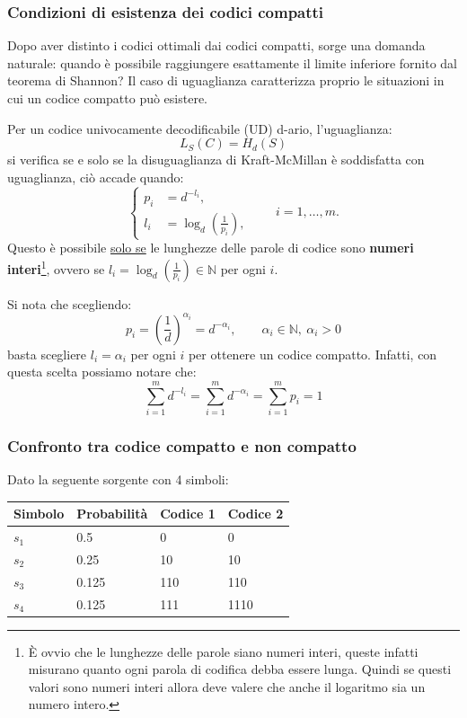 \documentclass{article}
\theoremstyle{definition}
\numberwithin{equation}{section}
\begin{document}
\subsubsection{Condizioni di esistenza dei codici compatti}\label{condizioni_codici_compatti}
Dopo aver distinto i codici ottimali dai codici compatti, sorge una domanda naturale: quando è possibile raggiungere esattamente il limite inferiore fornito dal teorema di Shannon? Il caso di uguaglianza caratterizza proprio le situazioni in cui un codice compatto può esistere.

Per un codice univocamente decodificabile (UD) d-ario, l'uguaglianza:
\[
    L_S(C)=H_d(S)
\]
si verifica se e solo se la disuguaglianza di Kraft-McMillan è soddisfatta con uguaglianza, ciò accade quando:
\[
    \left\{
    \begin{aligned}
        p_i & = d^{-l_i},                           \\
        l_i & = \log_d\!\left(\frac{1}{p_i}\right),
    \end{aligned}
    \right.
    \qquad i=1,\ldots,m.
\]
Questo è possibile \uline{solo se} le lunghezze delle parole di codice sono \textbf{numeri interi}\footnote{\`E ovvio che le lunghezze delle parole siano numeri interi, queste infatti misurano quanto ogni parola di codifica debba essere lunga. Quindi se questi valori sono numeri interi allora deve valere che anche il logaritmo sia un numero intero.}, ovvero se $l_i=\log_d\!\left(\frac{1}{p_i}\right)\in \mathbb{N}$ per ogni $i$.

Si nota che scegliendo:
\[
    p_i = \left(\frac{1}{d}\right)^{\alpha_i} = d^{-\alpha_i},
    \qquad \alpha_i \in \mathbb{N},\ \alpha_i > 0
\]
basta scegliere $l_i=\alpha_i$ per ogni $i$ per ottenere un codice compatto. Infatti, con questa scelta possiamo notare che:
\[
    \sum_{i=1}^m d^{-l_i} = \sum_{i=1}^m d^{-\alpha_i} = \sum_{i=1}^m p_i = 1
\]

\subsubsection{Confronto tra codice compatto e non compatto}
Dato la seguente sorgente con 4 simboli:
\begin{table}[htpb]
    \centering
    \begin{tabular}{|l|l|l|l|}
        \hline
        \textbf{Simbolo} & \textbf{Probabilità} & \textbf{Codice 1} & \textbf{Codice 2} \\ \hline
        $s_1$            & 0.5                  & 0                 & 0                 \\ \hline
        $s_2$            & 0.25                 & 10                & 10                \\ \hline
        $s_3$            & 0.125                & 110               & 110               \\ \hline
        $s_4$            & 0.125                & 111               & 1110              \\ \hline
    \end{tabular}
\end{table}
\end{document}
